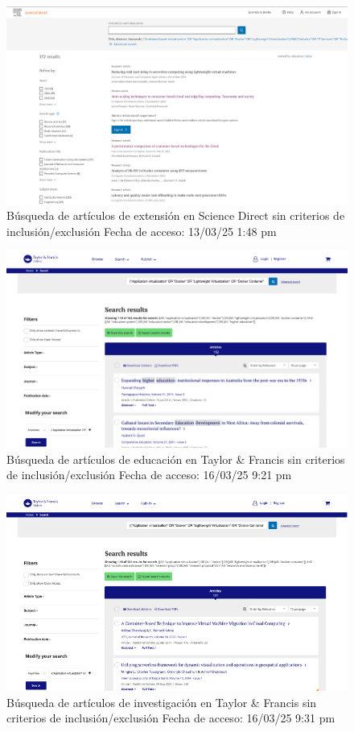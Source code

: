 \FloatBarrier\begin{figure}[H]
	\centering
	\includegraphics[width=\textwidth,keepaspectratio]{apendices/BD/sin-criterios/SD-ind.png}
	\caption{Búsqueda de artículos de extensión en Science Direct sin criterios de inclusión/exclusión
		Fecha de acceso: 13/03/25 1:48 pm}\label{fig:busqueda12}
\end{figure}
\FloatBarrier\begin{figure}[H]
	\centering
	\includegraphics[width=\textwidth,keepaspectratio]{apendices/BD/sin-criterios/TF-ed.png}
	\caption{Búsqueda de artículos de educación en Taylor \& Francis sin criterios de inclusión/exclusión
		Fecha de acceso: 16/03/25 9:21 pm}\label{fig:busqueda13}
\end{figure}
\FloatBarrier\begin{figure}[H]
	\centering
	\includegraphics[width=\textwidth,keepaspectratio]{apendices/BD/sin-criterios/TF-inv.png}
	\caption{Búsqueda de artículos de investigación en Taylor \& Francis sin criterios de inclusión/exclusión
		Fecha de acceso: 16/03/25 9:31 pm
	}\label{fig:busqueda14}
\end{figure}
